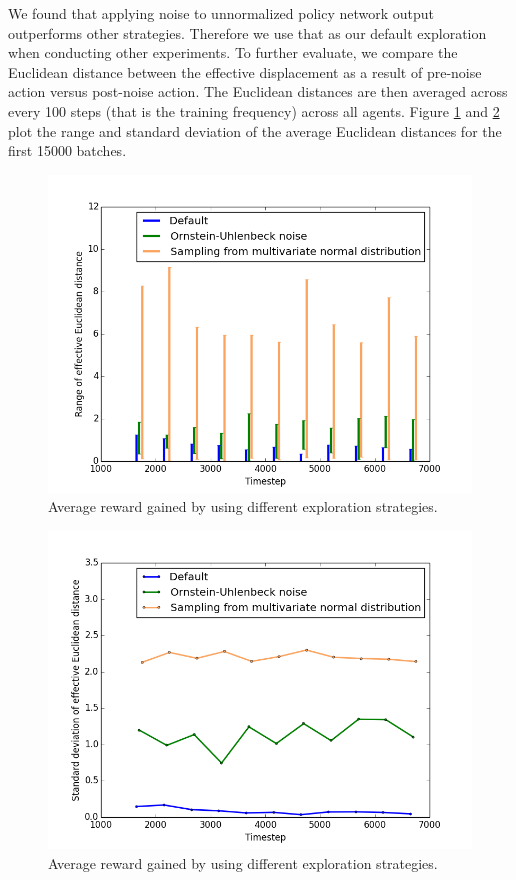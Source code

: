 \documentclass{article}
\begin{document}
We found that applying noise to unnormalized policy network output outperforms other strategies. Therefore we use that as our default exploration when conducting other experiments. To further evaluate, we compare the Euclidean distance between the effective displacement as a result of pre-noise action versus post-noise action. The Euclidean distances are then averaged across every 100 steps (that is the training frequency) across all agents. Figure \ref{fig:action_exploration_range} and \ref{fig:action_exploration_std_dev} plot the range and standard deviation of the average Euclidean distances for the first 15000 batches.

\begin{figure}
\begin{center}
\includegraphics[scale=0.4]{action_exploration_range}
\end{center}
\caption{Average reward gained by using different exploration strategies.}
\label{fig:action_exploration_range}
\end{figure}

\begin{figure}
\begin{center}
\includegraphics[scale=0.4]{action_exploration_std_dev}
\end{center}
\caption{Average reward gained by using different exploration strategies.}
\label{fig:action_exploration_std_dev}
\end{figure}
\end{document}
